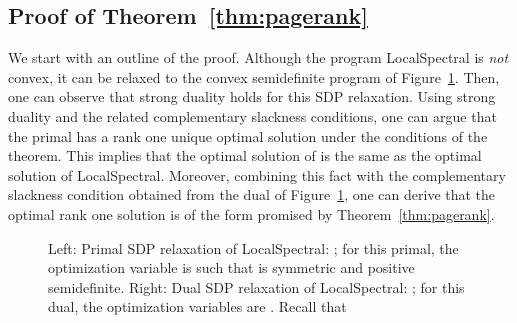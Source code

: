 \documentclass[11pt]{article}
\begin{document}
\subsection{Proof of Theorem~\ref{thm:pagerank}}
\label{sxn:optimize-proofs-pagerank}

We start with an outline of the proof.
Although the program \textsf{LocalSpectral}  is \emph{not} 
convex, it can be relaxed to the convex semidefinite program 
 of Figure~\ref{fig:sdp}. 
Then, one can observe that strong duality holds for this SDP relaxation. 
Using strong duality and the related complementary slackness conditions, one 
can argue that the primal  has a rank one unique optimal 
solution under the conditions of the theorem.
This implies that the optimal solution of  is the same 
as the optimal solution of \textsf{LocalSpectral}.
Moreover, combining this fact with the complementary slackness condition 
obtained from the dual  of Figure~\ref{fig:sdp}, one 
can derive that the optimal rank one solution is of the form promised by 
Theorem~\ref{thm:pagerank}.


\begin{figure}
\begin{minipage}{0.5\textwidth}
 
\end{minipage}
\begin{minipage}{.25\textwidth}

\end{minipage}
\caption{
Left:  Primal SDP relaxation of \textsf{LocalSpectral}:  
;  
for this primal, the optimization variable is  
such that  is symmetric and positive semidefinite.
Right: Dual SDP relaxation of \textsf{LocalSpectral}: 
;
for this dual, the optimization variables are . 
Recall that 
}
\label{fig:sdp}
\end{figure} 
\end{document}
